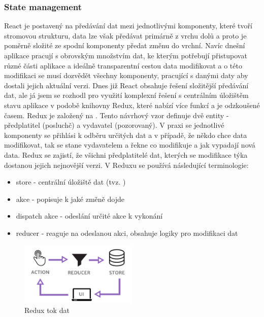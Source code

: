 \subsubsection{State management}
React je postavený na předávání dat mezi jednotlivými komponenty, které tvoří stromovou strukturu, data lze však předávat primárně z vrchu dolů a proto je poměrně složité ze spodní komponenty předat změnu do vrchní. Navíc dnešní aplikace pracují s obrovským množstvím dat, ke kterým potřebují přistupovat různé části aplikace a ideálně transparentní cestou data modifikovat a o této modifikaci se musí dozvědět všechny komponenty, pracující s danými daty aby dostali jejich aktuální verzi. Dnes již React obsahuje řešení složitější předávání dat, ale já jsem se rozhodl pro využití komplexní řešení s centrálním úložištěm stavu aplikace v podobě knihovny Redux, které nabízí více funkcí a je odzkoušené časem. Redux je založený na . Tento návrhový vzor definuje dvě entity - předplatitel (posluchč) a vydavatel (pozorovaný). V praxi se jednotlivé komponenty se přihlási k odběru určitých dat  a v případě, že někdo chce data modifikovat, tak se stane vydavatelem a řekne co modifikuje a jak vypadají nová data. Redux se zajistí, že všichni předplatitelé dat, kterých se modifikace týka dostanou jejich nejnovější verzi. V Reduxu se používá následující terminologie:
\begin{itemize}
    \item store - centrální úložiště dat (tvz. )
    \item akce - popisuje k jaké změně dojde
    \item dispatch akce - odeslání určité akce k vykonání
    \item reducer - reaguje na odeslanou akci, obsahuje logiky pro modifikaci dat
\end{itemize}
\begin{figure}[htbp]
    \centering
    \includegraphics[width=0.5\textwidth]{img/redux.png}
    \caption{Redux tok dat \cite{img-redux-flow}}
\end{figure}


